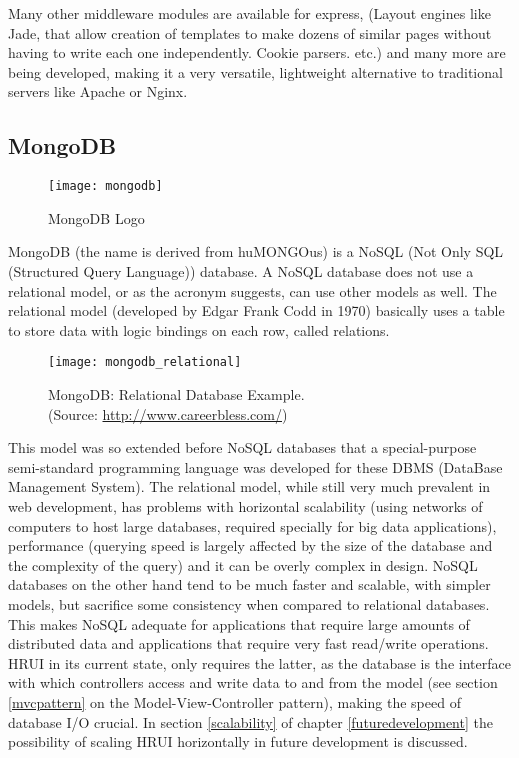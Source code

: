 Many other middleware modules are available for express, (Layout engines like Jade, that allow creation of templates to make dozens of similar pages without having to write each one independently. Cookie parsers. etc.) and many more are being developed, making it a very versatile, lightweight alternative to traditional servers like Apache or Nginx.
\subsection{MongoDB}
\begin{figure}[H]
  \captionsetup{justification=centering}
  \begin{center}
    \texttt{[image: mongodb]}
  \end{center}
  \caption{MongoDB Logo}
\end{figure}
MongoDB (the name is derived from huMONGOus) is a NoSQL (Not Only SQL (Structured Query Language)) database. A NoSQL database does not use a relational model, or as the acronym suggests, can use other models as well. The relational model (developed by Edgar Frank Codd in 1970) basically uses a table to store data with logic bindings on each row, called relations.
\begin{figure}[H]
  \captionsetup{justification=centering}
  \begin{center}
    \texttt{[image: mongodb\_relational]}
  \end{center}
  \caption{MongoDB: Relational Database Example.\\(Source: \url{http://www.careerbless.com/})}
\end{figure}
This model was so extended before NoSQL databases that a special-purpose semi-standard programming language was developed for these DBMS (DataBase Management System). The relational model, while still very much prevalent in web development, has problems with horizontal scalability (using networks of computers to host large databases, required specially for big data applications), performance (querying speed is largely affected by the size of the database and the complexity of the query) and it can be overly complex in design. NoSQL databases on the other hand tend to be much faster and scalable, with simpler models, but sacrifice some consistency when compared to relational databases. This makes NoSQL adequate for applications that require large amounts of distributed data and applications that require very fast read/write operations. HRUI in its current state, only requires the latter, as the database is the interface with which controllers access and write data to and from the model (see section \ref{mvcpattern} on the Model-View-Controller pattern), making the speed of database I/O crucial. In section \ref{scalability} of chapter \ref{futuredevelopment} the possibility of scaling HRUI horizontally in future development is discussed.\\

